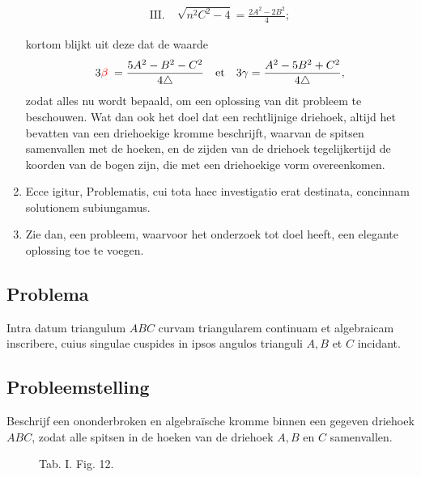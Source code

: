\documentclass[10pt,a4paper]{article}
\newcommand{\switchenum}{\setcounter{enumi}{\arabic{enumi}-1}\switchcolumn}
\begin{document}
\begin{paracol}{2}
\begin{enumerate}[topsep=1px]
\begin{align*}
			\text{III}. \;& \sqrt{n^2C^2-4} = \frac{2A^2-2B^2}{4};
		\end{align*}
		\par kortom blijkt uit deze dat de waarde
		\[
			3{\color{red}\beta}\; = \frac{5A^2-B^2-C^2}{4\triangle} \quad \text{et} \quad 3\gamma = \frac{A^2-5B^2+C^2}{4\triangle},
		\]
		zodat alles nu wordt bepaald, om een oplossing van dit probleem te beschouwen. Wat dan ook het doel dat een rechtlijnige driehoek, altijd het bevatten van een driehoekige kromme beschrijft, waarvan de spitsen samenvallen met de hoeken, en de zijden van de driehoek tegelijkertijd de koorden van de bogen zijn, die met een driehoekige vorm overeenkomen.
		
		\switchcolumn*
		
		\item Ecce igitur, Problematis, cui tota haec investigatio erat destinata, concinnam solutionem subiungamus.
		
		\switchenum
		\item Zie dan, een probleem, waarvoor het onderzoek tot doel heeft, een elegante oplossing toe te voegen.
		\switchcolumn*
	\end{enumerate}		


	\subsection*{Problema}
	\par Intra datum triangulum $A B C$ curvam triangularem continuam et algebraicam inscribere, cuius singulae cuspides in ipsos angulos trianguli $A, B$ et $C$ incidant.
	
	\switchcolumn
	\subsection*{Probleemstelling}
	
	\par Beschrijf een ononderbroken en algebraïsche kromme binnen een gegeven driehoek $ABC$, zodat alle spitsen in de hoeken van de driehoek $A,B$ en $C$ samenvallen.
	
	\switchcolumn*
	
	\begin{figure}[h]
		\centering
		\par {
			\selectfont
			\begin{tikzpicture}[rotate=180, scale=1]
			
			\end{tikzpicture}}
		\selectfont
		\caption{Tab. I. Fig. 12.}
	\end{figure}
	\switchcolumn
	\begin{figure}[h]
		\centering
		\par {
			\selectfont
			\begin{tikzpicture}[rotate=180, scale=1]
			

\end{tikzpicture}}
\end{figure}
\end{paracol}
\end{document}
